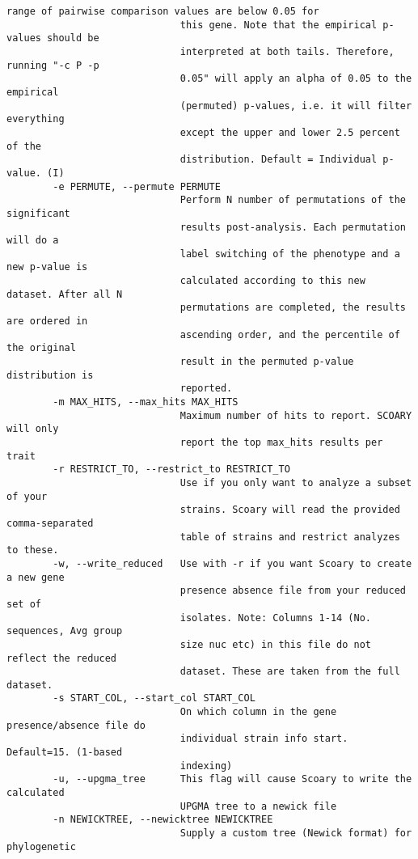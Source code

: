\documentclass{article}
\begin{document}
\begin{lstlisting}[basicstyle=\fontsize{6}{11}\ttfamily,breaklines]
                              range of pairwise comparison values are below 0.05 for
                              this gene. Note that the empirical p-values should be
                              interpreted at both tails. Therefore, running "-c P -p
                              0.05" will apply an alpha of 0.05 to the empirical
                              (permuted) p-values, i.e. it will filter everything
                              except the upper and lower 2.5 percent of the
                              distribution. Default = Individual p-value. (I)
        -e PERMUTE, --permute PERMUTE
                              Perform N number of permutations of the significant
                              results post-analysis. Each permutation will do a
                              label switching of the phenotype and a new p-value is
                              calculated according to this new dataset. After all N
                              permutations are completed, the results are ordered in
                              ascending order, and the percentile of the original
                              result in the permuted p-value distribution is
                              reported.
        -m MAX_HITS, --max_hits MAX_HITS
                              Maximum number of hits to report. SCOARY will only
                              report the top max_hits results per trait
        -r RESTRICT_TO, --restrict_to RESTRICT_TO
                              Use if you only want to analyze a subset of your
                              strains. Scoary will read the provided comma-separated
                              table of strains and restrict analyzes to these.
        -w, --write_reduced   Use with -r if you want Scoary to create a new gene
                              presence absence file from your reduced set of
                              isolates. Note: Columns 1-14 (No. sequences, Avg group
                              size nuc etc) in this file do not reflect the reduced
                              dataset. These are taken from the full dataset.
        -s START_COL, --start_col START_COL
                              On which column in the gene presence/absence file do
                              individual strain info start. Default=15. (1-based
                              indexing)
        -u, --upgma_tree      This flag will cause Scoary to write the calculated
                              UPGMA tree to a newick file
        -n NEWICKTREE, --newicktree NEWICKTREE
                              Supply a custom tree (Newick format) for phylogenetic

\end{lstlisting}
\end{document}
